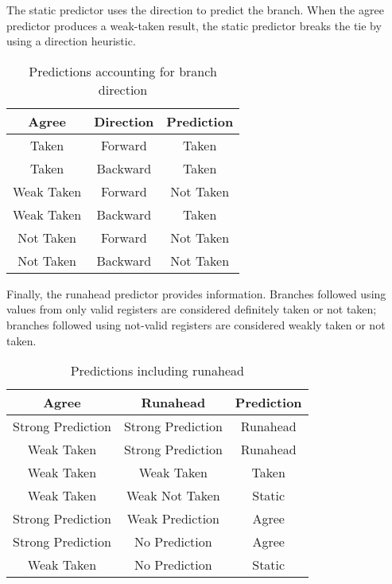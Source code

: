 The static predictor uses the direction to predict the branch.  When the agree
predictor produces a weak-taken result, the static predictor breaks the tie by
using a direction heuristic.

\begin{table}[htp]
    \centering
\begin{tabular}{|c|c|c|}
    \hline
    Agree & Direction & Prediction \\
    \hline
    Taken & Forward & Taken \\
    \hline
    Taken & Backward & Taken \\
    \hline
    Weak Taken & Forward & Not Taken \\
    \hline
    Weak Taken & Backward & Taken \\
    \hline
    Not Taken & Forward & Not Taken \\
    \hline
    Not Taken & Backward & Not Taken \\
    \hline
\end{tabular}
\caption{Predictions accounting for branch direction}
\label{tab:branch-static-hybrid}
\end{table}

Finally, the runahead predictor provides information.  Branches followed using
values from only valid registers are considered definitely taken or not taken;
branches followed using not-valid registers are considered weakly taken or not
taken.

\begin{table}[htp]
    \centering
    \begin{tabular}{|c|c|c|}
        \hline
        Agree & Runahead & Prediction \\
        \hline
        Strong Prediction & Strong Prediction & Runahead \\
        \hline
        Weak Taken & Strong Prediction & Runahead \\
        \hline
        Weak Taken & Weak Taken & Taken \\
        \hline
        Weak Taken & Weak Not Taken & Static \\
        \hline
        Strong Prediction & Weak Prediction & Agree \\
        \hline
        Strong Prediction & No Prediction & Agree \\
        \hline
        Weak Taken & No Prediction & Static \\
        \hline
    \end{tabular}
\caption{Predictions including runahead}
\end{table}

